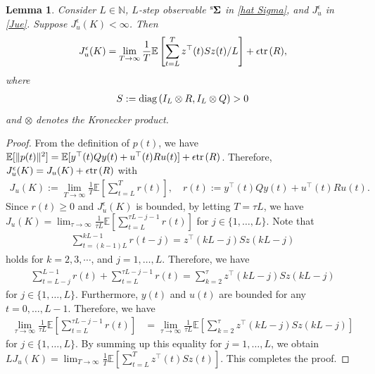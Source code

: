 \documentclass[preprint,5p,times,twocolumn]{elsarticle}
\newcommand{\bm}[1]{{\mbox{\boldmath $#1$}}}
\newtheorem{lem}{Lemma}
\def\tr{{\rm tr} \hspace{0.5mm}}
\def\rms{{}^{\rm s}\hspace{-0.2mm}}
\begin{document}
\begin{lem}\label{J_lemma}
Consider $L \in \mathbb N$, $L$-step observable $\rms{\bm \Sigma}$ in \eqref{hat Sigma}, and $J_u^{\epsilon}$ in \eqref{Jue}. Suppose $J_u^{\epsilon}(K) < \infty$. Then
\begin{align}
    J_u^{\epsilon}(K) = \lim_{T \rightarrow \infty} \frac{1}{T} \mathbb E
    \left[\sum_{t=L}^{T}z^{\top}(t)S z(t) / L\right] + \epsilon\tr(R), 
\end{align}
where
 \begin{align}\label{defGss}
 S := {\rm diag}\left(I_L \otimes R, I_L \otimes Q\right) > 0  
 \end{align}
and $\otimes$ denotes the Kronecker product.
\end{lem}
\begin{proof}
From the definition of $p(t)$, we have $\mathbb E[\|p(t)\|^2] = \mathbb E[y^{\top}(t)Qy(t)+u^{\top}(t)Ru(t)] + \epsilon\tr(R)$. Therefore, $J_u^{\epsilon}(K) = J_u(K) + \epsilon\tr(R)$ with 
\begin{align}
    J_u(K) := \lim_{T \rightarrow \infty} \frac{1}{T}\mathbb E\left[\sum_{t=L}^{T}r(t)\right], \quad  r(t) := y^{\top}(t)Qy(t) + u^{\top}(t)Ru(t).
\end{align}
Since $r(t) \geq 0$ and $J_u^{\epsilon}(K)$ is bounded, by letting $T = \tau L$, we have $J_u(K) = \lim_{\tau \rightarrow \infty} \frac{1}{\tau L}\mathbb E\left[\sum_{t=L}^{\tau L - j-1}r(t)\right]$ for $j \in \{1, \ldots, L\}$. Note that
 \begin{align}
     \sum_{t=(k-1)L}^{kL-1} r(t-j)  = z^{\top}(kL-j)S z(kL-j) \label{J_alter}
 \end{align}
  holds for $k = 2,3,\cdots$, and $j = 1, \ldots, L$. 
  Therefore, we have
  \begin{align}
      \sum_{t=L-j}^{L-1} r(t) + \sum_{t=L}^{\tau L- j - 1} r(t) = \sum_{k=2}^{\tau} z^{\top}(kL-j)Sz(kL-j)
  \end{align}
  for $j \in \{1,\ldots,L\}$. Furthermore, $y(t)$ and $u(t)$ are bounded for any $t = 0, \ldots, L-1$. Therefore, we have 
\begin{align}
    \lim_{\tau \rightarrow \infty}\frac{1}{\tau L}\mathbb E\left[\sum_{t=L}^{\tau L- j - 1} r(t)\right] &= \lim_{\tau \rightarrow \infty} \frac{1}{\tau L} \mathbb E
    \left[\sum_{k=2}^{\tau}z^{\top}(kL-j)S z(kL-j)\right]
\end{align}
for $j \in \{1,\ldots,L\}$. By summing up this equality for $j = 1, \ldots, L$, we obtain
$L J_u(K) = \lim_{T \rightarrow \infty} \frac{1}{T} \mathbb E \left[\sum_{t=L}^{T}z^{\top}(t)S z(t)\right]. $
This completes the proof. 
\end{proof}
\end{document}
